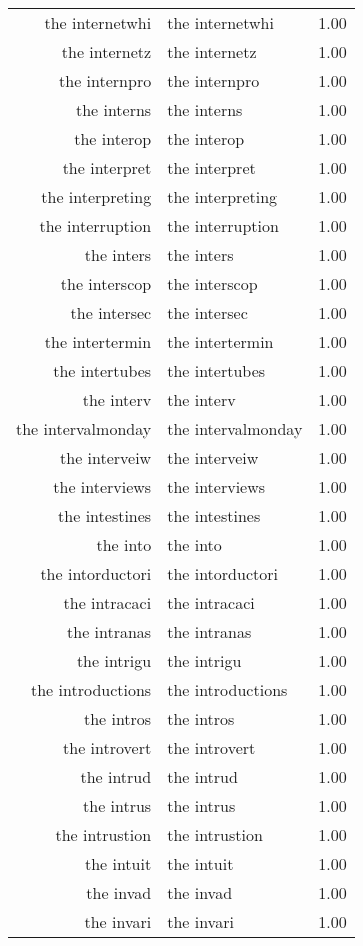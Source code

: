 \begin{table}[ht]
\begin{tabular}{rlr}
  the internetwhi & the internetwhi & 1.00 \\ 
  the internetz & the internetz & 1.00 \\ 
  the internpro & the internpro & 1.00 \\ 
  the interns & the interns & 1.00 \\ 
  the interop & the interop & 1.00 \\ 
  the interpret & the interpret & 1.00 \\ 
  the interpreting & the interpreting & 1.00 \\ 
  the interruption & the interruption & 1.00 \\ 
  the inters & the inters & 1.00 \\ 
  the interscop & the interscop & 1.00 \\ 
  the intersec & the intersec & 1.00 \\ 
  the intertermin & the intertermin & 1.00 \\ 
  the intertubes & the intertubes & 1.00 \\ 
  the interv & the interv & 1.00 \\ 
  the intervalmonday & the intervalmonday & 1.00 \\ 
  the interveiw & the interveiw & 1.00 \\ 
  the interviews & the interviews & 1.00 \\ 
  the intestines & the intestines & 1.00 \\ 
  the into & the into & 1.00 \\ 
  the intorductori & the intorductori & 1.00 \\ 
  the intracaci & the intracaci & 1.00 \\ 
  the intranas & the intranas & 1.00 \\ 
  the intrigu & the intrigu & 1.00 \\ 
  the introductions & the introductions & 1.00 \\ 
  the intros & the intros & 1.00 \\ 
  the introvert & the introvert & 1.00 \\ 
  the intrud & the intrud & 1.00 \\ 
  the intrus & the intrus & 1.00 \\ 
  the intrustion & the intrustion & 1.00 \\ 
  the intuit & the intuit & 1.00 \\ 
  the invad & the invad & 1.00 \\ 
  the invari & the invari & 1.00 \\ 

\end{tabular}
\end{table}
